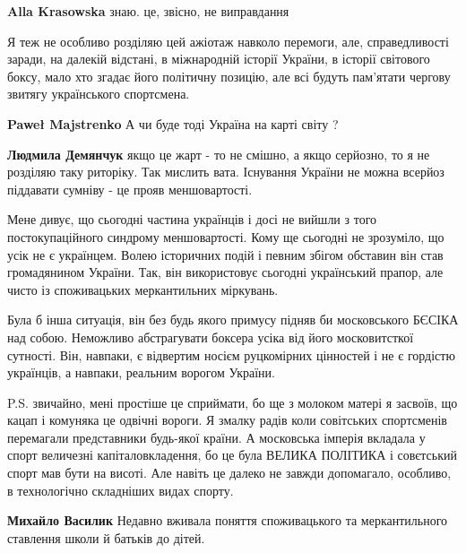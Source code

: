 \begin{itemize}
\begin{itemize}
\textbf{Alla Krasowska} знаю. це, звісно, не виправдання
\end{itemize} %


Я теж не особливо розділяю цей ажіотаж навколо перемоги, але, справедливості
заради, на далекій відстані, в міжнародній історії України, в історії світового
боксу, мало хто згадає його політичну позицію, але всі будуть пам'ятати чергову
звитягу українського спортсмена.

\begin{itemize} %
\textbf{Paweł Majstrenko} А чи буде тоді Україна на карті світу ?

\textbf{Людмила Демянчук} якщо це жарт - то не смішно, а якщо серйозно, то я не розділяю таку риторіку. Так мислить вата. Існування України не можна всерйоз піддавати сумніву - це прояв меншовартості.
\end{itemize} %


Мене дивує, що сьогодні частина українців і досі не вийшли з того
постокупаційного синдрому меншовартості. Кому ще сьогодні не зрозуміло, що усік
не є українцем. Волею історичних подій і певним збігом обставин він став
громадянином України. Так, він використовує сьогодні український прапор, але
чисто із споживацьких меркантильних міркувань. 

Була б інша ситуація, він без будь якого примусу підняв би московського БЄСІКА
над собою. Неможливо абстрагувати боксера усіка від його московитсткої
сутності. Він, навпаки, є відвертим носієм руцкомірних цінностей і не є
гордістю українців, а навпаки, реальним ворогом України.

P.S. звичайно, мені простіше це сприймати, бо ще з молоком матері я засвоїв, що
кацап і комуняка це одвічні вороги. Я змалку радів коли совітських спортсменів
перемагали представники будь-якої країни. А московська імперія вкладала у спорт
величезні капіталовкладення, бо це була ВЕЛИКА ПОЛІТИКА і совєтський спорт мав
бути на висоті. Але навіть це далеко не завжди допомагало, особливо, в
технологічно складніших видах спорту.

\begin{itemize} %
\textbf{Михайло Василик} Недавно вживала поняття споживацького та меркантильного ставлення школи й батьків до дітей.


\end{itemize}
\end{itemize}
